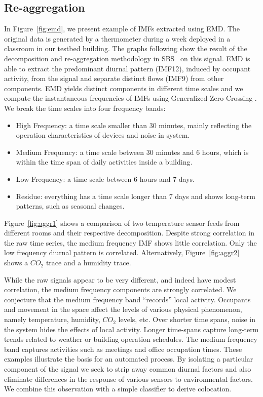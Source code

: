 \subsection{Re-aggregation}\label{sec:aggr}
In Figure~\ref{fig:emd}, we present example of IMFs extracted using EMD. The original data is generated by a thermometer during a week deployed in a classroom in our testbed building.  The graphs following show the result of the decomposition and re-aggregation methodology in SBS~\cite{SBS}
on this signal.
EMD is able to extract the predominant diurnal pattern (IMF12), induced by occupant activity, from the signal and separate 
distinct flows (IMF9) from other components.  
EMD yields distinct components in different time scales and we compute the instantaneous frequencies \cite{IF} of IMFs using Generalized Zero-Crossing \cite{GZC}. We break the time scales into four frequency bands:
\begin{itemize}
\item High Frequency: a time scale smaller than 30 minutes, mainly reflecting the operation characteristics of devices and noise in system. 
\item Medium Frequency: a time scale between 30 minutes and 6 hours, which is within the time span of daily activities inside a building.
\item Low Frequency: a time scale between 6 hours and 7 days. %
\item Residue: everything has a time scale longer than 7 days and shows long-term patterns, such as seasonal changes.
\end{itemize}
Figure~\ref{fig:aggr1} shows a comparison of two temperature sensor feeds from different rooms and their respective
decomposition.  Despite strong correlation in the raw time series, the medium frequency IMF shows little correlation.
Only the low frequency diurnal pattern is correlated.  Alternatively,  Figure~\ref{fig:aggr2} shows a $CO_{2}$ trace and a humidity trace.

While the raw signals appear to be very different, and indeed have modest correlation, the medium frequency components
are strongly correlated.  We conjecture that the medium frequency band ``records'' local activity.  Occupants
and movement in the space affect the levels of various physical phenomenon, namely temperature, humidity, $CO_{2}$ levels, etc.
Over shorter time spans, noise in the system hides the effects of local activity.  Longer time-spans capture long-term trends 
related to weather or building operation schedules.  The medium frequency band
captures activities such as meetings and office occupation times.  
These examples illustrate the basis for an automated process.  By isolating a particular component of the signal
we seek to strip away common diurnal factors and also eliminate differences in the response of various sensors to environmental factors.
We combine this observation with a simple classifier to derive colocation.

